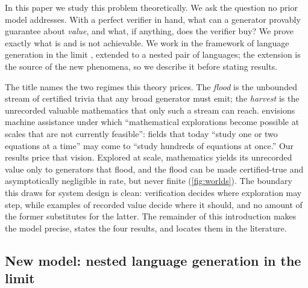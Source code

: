 \documentclass[11pt]{article}
\numberwithin{equation}{section}
\theoremstyle{plain}
\theoremstyle{definition}
\theoremstyle{remark}
\begin{document}
In this paper we study this problem theoretically. We ask the question no prior model
addresses. With a perfect verifier in hand, what can a generator provably guarantee about
\emph{value}, and what, if anything, does the verifier buy? We prove exactly what is and is
not achievable. We work in the framework of language generation in the limit
\citep{kleinberg2024language}, extended to a nested pair of languages; the extension is the
source of the new phenomena, so we describe it before stating results.

The title names the two regimes this theory prices. The \emph{flood} is the unbounded stream
of certified trivia that any broad generator must emit; the \emph{harvest} is the unrecorded
valuable mathematics that only such a stream can reach. \citet{tao2025machine} envisions
machine assistance under which ``mathematical explorations become possible at scales that are
not currently feasible'': fields that today ``study one or two equations at a time'' may come
to ``study hundreds of equations at once.'' Our results price that vision. Explored at scale,
mathematics yields its unrecorded value only to generators that flood, and the flood can be
made certified-true and asymptotically negligible in rate, but never finite
(\cref{fig:worlds}).
The boundary this draws for system design is clean: verification decides where exploration
may step, while examples of recorded value decide where it should, and no amount of the
former substitutes for the latter. The remainder of this introduction makes the model
precise, states the four results, and locates them in the literature.

\subsection{New model: nested language generation in the limit}
\label{sec:intro-model}
\end{document}
